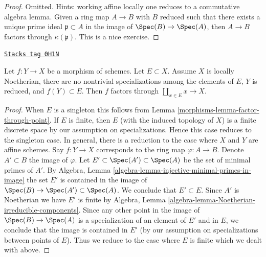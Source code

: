 \begin{proof}
Omitted. Hints: working affine locally one reduces to a commutative algebra
lemma. Given a ring map $A \to B$ with $B$ reduced such that there exists
a unique prime ideal $\mathfrak p \subset A$ in the image of
$\Spec(B) \to \Spec(A)$, then $A \to B$ factors through $\kappa(\mathfrak p)$.
This is a nice exercise.
\end{proof}

\begin{lemma}
\label{morphisms-lemma-factor-through-set-of-points}
\href{https://stacks.math.columbia.edu/tag/0H1N}{\texttt{Stacks tag 0H1N}}

Let $f : Y \to X$ be a morphism of schemes. Let $E \subset X$.
Assume $X$ is locally Noetherian, there are no nontrivial specializations
among the elements of $E$, $Y$ is reduced, and $f(Y) \subset E$.
Then $f$ factors through $\coprod_{x \in E} x \to X$.
\end{lemma}

\begin{proof}

When $E$ is a singleton this follows from
Lemma \ref{morphisms-lemma-factor-through-point}. If $E$ is finite, then $E$
(with the induced topology of $X$) is a finite discrete space by
our assumption on specializations. Hence this case reduces to the
singleton case. In general, there is a reduction to the
case where $X$ and $Y$ are affine schemes. Say $f : Y \to X$ corresponds to
the ring map $\varphi : A \to B$. Denote $A' \subset B$ the image of $\varphi$.
Let $E' \subset \Spec(A') \subset \Spec(A)$ be the set of minimal primes
of $A'$. By Algebra, Lemma \ref{algebra-lemma-injective-minimal-primes-in-image}
the set $E'$ is contained in the image of
$\Spec(B) \to \Spec(A') \subset \Spec(A)$. We conclude that $E' \subset E$.
Since $A'$ is Noetherian we have $E'$ is finite by Algebra, Lemma
\ref{algebra-lemma-Noetherian-irreducible-components}.
Since any other point in the image of $\Spec(B) \to \Spec(A)$ is
a specialization of an element of $E'$ and in $E$, we conclude that
the image is contained in $E'$ (by our assumption on specializations between
points of $E$). Thus we reduce to the case where
$E$ is finite which we dealt with above.
\end{proof}



